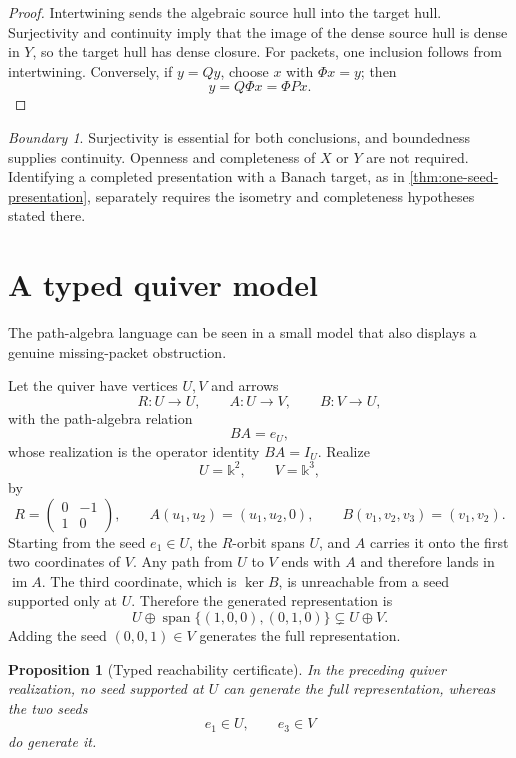 \documentclass[11pt]{article}
\newtheorem{proposition}[theorem]{Proposition}
\theoremstyle{definition}
\theoremstyle{remark}
\newtheorem{boundary}[theorem]{Boundary}
\newcommand{\Span}{\operatorname{span}}
\newcommand{\im}{\operatorname{im}}
\newcommand{\bbk}{\mathbb{k}}
\begin{document}
\begin{proof}
Intertwining sends the algebraic source hull into the target hull. Surjectivity and continuity imply that the image of the dense source hull is dense in $Y$, so the target hull has dense closure. For packets, one inclusion follows from intertwining. Conversely, if $y=Qy$, choose $x$ with $\Phi x=y$; then
\[
 y=Q\Phi x=\Phi Px.
\]
\end{proof}

\begin{boundary}
Surjectivity is essential for both conclusions, and boundedness supplies continuity. Openness and completeness of $X$ or $Y$ are not required. Identifying a completed presentation with a Banach target, as in \cref{thm:one-seed-presentation}, separately requires the isometry and completeness hypotheses stated there.
\end{boundary}

\section{A typed quiver model}

The path-algebra language can be seen in a small model that also displays a genuine missing-packet obstruction.

Let the quiver have vertices $U,V$ and arrows
\[
R:U\to U,
\qquad
A:U\to V,
\qquad
B:V\to U,
\]
with the path-algebra relation
\[
BA=e_U,
\]
whose realization is the operator identity $BA=I_U$.
Realize
\[
U=\bbk^2,
\qquad
V=\bbk^3,
\]
by
\[
R=
\begin{pmatrix}0&-1\\1&0\end{pmatrix},
\qquad
A(u_1,u_2)=(u_1,u_2,0),
\qquad
B(v_1,v_2,v_3)=(v_1,v_2).
\]
Starting from the seed $e_1\in U$, the $R$-orbit spans $U$, and $A$ carries it onto the first two coordinates of $V$. Any path from $U$ to $V$ ends with $A$ and therefore lands in $\im A$. The third coordinate, which is $\ker B$, is unreachable from a seed supported only at $U$. Therefore the generated representation is
\[
U\oplus\Span\{(1,0,0),(0,1,0)\}
\subsetneq U\oplus V.
\]
Adding the seed $(0,0,1)\in V$ generates the full representation.

\begin{proposition}[Typed reachability certificate]
\label{prop:typed-reachability}
In the preceding quiver realization, no seed supported at $U$ can generate the full representation, whereas the two seeds
\[
e_1\in U,
\qquad
e_3\in V
\]
do generate it.
\end{proposition}
\end{document}
